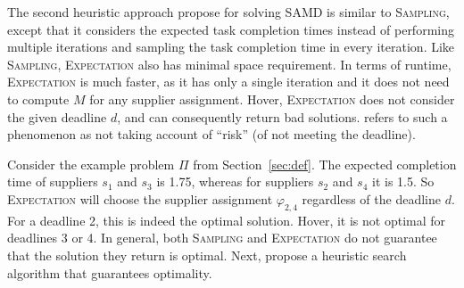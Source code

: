 \documentclass[letterpaper]{article} %
\newcommand{\samd}{\ac{SAMD}\xspace}
\newcommand{\sampling}{\textsc{Sampling}\xspace}
\newcommand{\expectation}{\textsc{Expectation}\xspace}
\begin{document}
The second heuristic approach  propose for solving \samd is
similar to \sampling, except that it considers the expected task completion times instead of performing multiple iterations and sampling the task completion time in every iteration.
Like \sampling, \expectation also has minimal space requirement. In terms of runtime, \expectation is much faster, as it has only a single iteration and it does not need to compute $M$ for any supplier assignment. Hover, \expectation does not consider the given deadline $d$, and can consequently return bad solutions. \citeauthor{loui1983optimal} refers to such a phenomenon as not taking account of ``risk'' (of not meeting the deadline).

Consider the example problem $\Pi$ from Section~\ref{sec:def}. The expected completion time of suppliers $s_1$ and $s_3$ is 1.75, whereas for suppliers $s_2$ and $s_4$ it is 1.5. So \expectation will choose the supplier assignment $\varphi_{2,4}$ regardless of the deadline $d$. For a deadline 2, this is indeed the optimal solution. Hover, it is not optimal for deadlines 3 or 4. In general, both \sampling and \expectation do not guarantee that the solution they return is optimal. Next,  propose a heuristic search algorithm that guarantees optimality.







\end{document}
